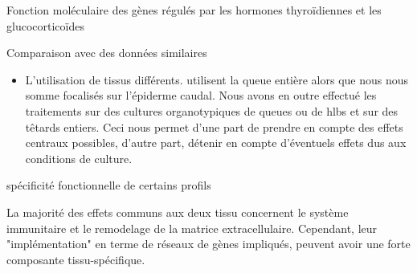 \documentclass[../main.tex]{subfiles}
\begin{document}
\begin{chapter}{Fonction moléculaire des gènes régulés par les hormones thyroïdiennes et les glucocorticoïdes}
\begin{section}{Comparaison avec des données similaires}
\begin{itemize}
Nous avons vu que cette approche est discutable en raison du faible pouvoir statistique des données à haut débit (puces à \gls{dna} et \gls{ngs} confondues).
Les catégories de gènes définies dans l'article sont donc bruitées et correspondent plus à une description 'technique' des résultats qu'à une description des différents profils d'expression des gènes.
\item L'utilisation de tissus différents.
\citep{Kulkarni2011} utilisent la queue entière alors que nous nous somme focalisés sur l'épiderme caudal.
Nous avons en outre effectué les traitements sur des cultures organotypiques de queues ou de \glspl{hlb} et sur des têtards entiers.
Ceci nous permet d'une part de prendre en compte des effets centraux possibles, d'autre part, détenir en compte d'éventuels effets dus aux conditions de culture.
\end{itemize}

\end{section}


\begin{section}{spécificité fonctionnelle de certains profils}

La majorité des effets communs aux deux tissu concernent le système immunitaire et le remodelage de la matrice extracellulaire.
Cependant, leur "implémentation" en terme de réseaux de gènes impliqués, peuvent avoir une forte composante tissu-spécifique.


\end{section}
\end{chapter}
\end{document}
